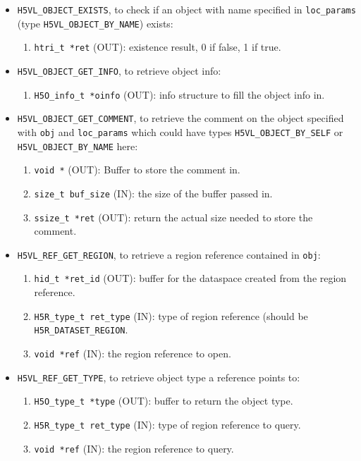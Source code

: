 \begin{itemize}
\item {\tt H5VL\_OBJECT\_EXISTS}, to check if an object with name
  specified in {\tt loc\_params} (type {\tt H5VL\_OBJECT\_BY\_NAME})
  exists:
  \begin{enumerate}
  \item {\tt htri\_t *ret} (OUT): existence result, 0 if false, 1 if true.
  \end{enumerate}

\item {\tt H5VL\_OBJECT\_GET\_INFO}, to retrieve object info:
  \begin{enumerate}
  \item {\tt H5O\_info\_t *oinfo} (OUT): info structure to fill the
    object info in.
  \end{enumerate}

\item {\tt H5VL\_OBJECT\_GET\_COMMENT}, to retrieve the comment on the
  object specified with {\tt obj} and {\tt loc\_params} which could
  have types {\tt H5VL\_OBJECT\_BY\_SELF} or {\tt
    H5VL\_OBJECT\_BY\_NAME} here:
  \begin{enumerate}
  \item {\tt void *} (OUT): Buffer to store the comment in.
  \item {\tt size\_t buf\_size} (IN): the size of the buffer passed in.
  \item {\tt ssize\_t *ret} (OUT): return the actual size needed
    to store the comment.
  \end{enumerate}

\item {\tt H5VL\_REF\_GET\_REGION}, to retrieve a region reference
  contained in {\tt obj}:
  \begin{enumerate}
  \item {\tt hid\_t *ret\_id} (OUT): buffer for the dataspace created
    from the region reference.
  \item {\tt H5R\_type\_t ret\_type} (IN): type of region reference
    (should be {\tt H5R\_DATASET\_REGION}.
  \item {\tt void *ref} (IN): the region reference to open.
  \end{enumerate}

\item {\tt H5VL\_REF\_GET\_TYPE}, to retrieve object type a reference
  points to:
  \begin{enumerate}
  \item {\tt H5O\_type\_t *type} (OUT): buffer to return the object type.
  \item {\tt H5R\_type\_t ret\_type} (IN): type of region reference to
    query.
  \item {\tt void *ref} (IN): the region reference to query.
  \end{enumerate}


\end{itemize}
